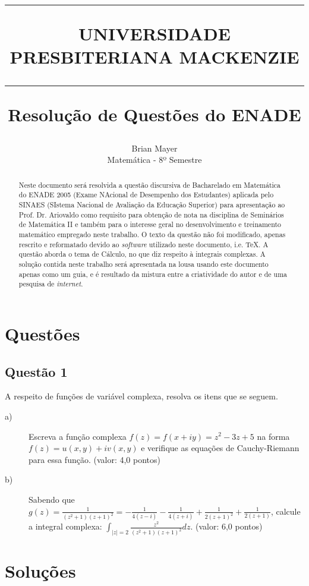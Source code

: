 \documentclass[12pt]{article}
\title{\hrule \vspace{11pt} \Large{\color{red} UNIVERSIDADE PRESBITERIANA MACKENZIE} \vspace{10pt}\\
\hrule \vspace{60pt}
\color{blue} Resolução de Questões do ENADE}
\author{Brian Mayer\\
\color{red} Matemática - 8º Semestre}
\date{}
\begin{document}
\maketitle

\begin{abstract}
Neste documento será resolvida a questão discursiva de Bacharelado em Matemática do ENADE 2005 (Exame NAcional de Desempenho dos Estudantes) aplicada pelo SINAES (SIstema Nacional de Avaliação da Educação Superior) para apresentação ao Prof. Dr. Ariovaldo como requisito para obtenção de nota na disciplina de Seminários de Matemática II e também para o interesse geral no desenvolvimento e treinamento matemático empregado neste trabalho. O texto da questão não foi modificado, apenas rescrito e reformatado devido ao \emph{software} utilizado neste documento, i.e. \TeX. A questão aborda o tema de Cálculo, no que diz respeito à integrais complexas. A solução contida neste trabalho será apresentada na lousa usando este documento apenas como um guia, e é resultado da mistura entre a criatividade do autor e de uma pesquisa de \emph{internet}.
\end{abstract}

\section*{\color{blue} Questões}

\subsection*{\color{blue} Questão 1}

A respeito de funções de variável complexa, resolva os itens que se seguem.

\begin{description}

\item[a)] Escreva a função complexa $f(z) = f(x + iy) = z^2 -3z + 5$ na forma $f(z) = u(x, y) + i v(x, y)$ e verifique as equações de Cauchy-Riemann para essa função. (valor: 4,0 pontos)

\item[b)] Sabendo que $g(z)=\displaystyle \frac1{(z^2+1)(z+1)^2}=-\frac1{4(z-i)}-\frac1{4(z+i)}+\frac1{2(z+1)^2}+\frac1{2(z+1)}$, calcule a integral complexa: $\displaystyle \int_{|z|=2}\frac{z^2}{(z^2+1)(z+1)^2}dz$. (valor: 6,0 pontos)

\end{description}

\section*{\color{red} Soluções}
\end{document}

